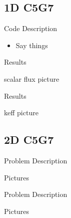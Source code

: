 
\subsection{1D C5G7}
\begin{frame}[t]{Code Description}
    
    \begin{itemize}
        \item Say things
    \end{itemize}

\end{frame}


\begin{frame}[t]{Results}
    
    scalar flux picture
    
\end{frame}


\begin{frame}[t]{Results}

keff picture

\end{frame}


\subsection{2D C5G7}
\begin{frame}[t]{Problem Description}
    
    Pictures
    
\end{frame}


\begin{frame}[t]{Problem Description}
    
    Pictures
    
\end{frame}


